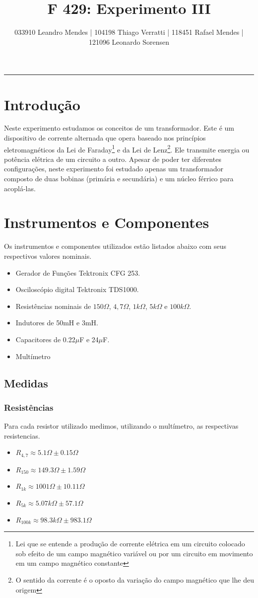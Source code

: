 \documentclass[12pt,letterpaper]{article}
\title{F 429: Experimento III}
\author{033910 Leandro Mendes | 104198 Thiago Verratti | 118451 Rafael Mendes | 121096 Leonardo Sorensen}
\makeatletter
\def\thickhrulefill{\leavevmode \leaders \hrule height 1pt\hfill \kern \z@}
\renewcommand{\maketitle}{
	\begingroup
		\parindent \z@
		\begin{center}
			{\normalsize \@author\par}%
			\thickhrulefill\par
			{\small\raggedleft \@date\par}%
			{\Large\raggedright \@title\par}%
		\end{center}%
	\endgroup
}
\makeatother
\begin{document}
\maketitle
\tableofcontents
\listoffigures
\listoftables
\newpage
\section{Introdução}
Neste experimento estudamos os conceitos de um transformador. Este é um dispositivo de corrente alternada que opera baseado nos princípios eletromagnéticos da Lei de Faraday\footnote{Lei que se entende a produção de corrente elétrica em um circuito colocado sob efeito de um campo magnético variável ou por um circuito em movimento em um campo magnético constante} e da Lei de Lenz\footnote{O sentido da corrente é o oposto da variação do campo magnético que lhe deu origem}. Ele transmite energia ou potência elétrica de um circuito a outro. Apesar de poder ter diferentes configurações, neste experimento foi estudado apenas um transformador composto de duas bobinas (primária e secundária) e um núcleo férrico para acoplá-las.
\section{Instrumentos e Componentes}
Os instrumentos e componentes utilizados estão listados abaixo com seus respectivos valores nominais.
\begin{itemize}
\item{Gerador de Funções Tektronix CFG 253.} 
\item{Osciloscópio digital Tektronix TDS1000.}
\item{Resistências nominais de $150\Omega$, $4,7\Omega$, $1k\Omega$, $5k\Omega$ e $100k\Omega$.}
\item{Indutores de 50mH e 3mH.}
\item{Capacitores de 0.22$\mu$F e 24$\mu$F.}
\item{Multímetro}
\end{itemize}
\subsection{Medidas}
\subsubsection{Resistências} \label{itm:mres} Para cada resistor utilizado medimos, utilizando o multímetro, as respectivas resistencias.
\begin{itemize}
\item{$R_{4,7} \approx 5.1\Omega \pm 0.15\Omega$}
\item{$R_{150} \approx 149.3\Omega \pm 1.59\Omega$}
\item{$R_{1k} \approx 1001\Omega \pm 10.11\Omega$} \label{itm:r1k}
\item{$R_{5k} \approx 5.07k\Omega \pm 57.1\Omega$} \label{itm:r5k}
\item{$R_{100k} \approx 98.3k\Omega \pm 983.1\Omega$}
\end{itemize}
\end{document}
